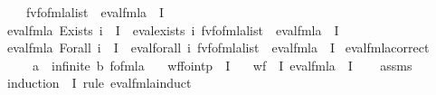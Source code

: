 \begin{isabellebody}
\ \ \ \ {\isacharparenleft}{\kern0pt}fv{\isacharunderscore}{\kern0pt}fo{\isacharunderscore}{\kern0pt}fmla{\isacharunderscore}{\kern0pt}list\ {\isasympsi}{\isacharparenright}{\kern0pt}\ {\isacharparenleft}{\kern0pt}eval{\isacharunderscore}{\kern0pt}fmla\ {\isasympsi}\ I{\isacharparenright}{\kern0pt}{\isachardoublequoteclose}\isanewline
{\isacharbar}{\kern0pt}\ {\isachardoublequoteopen}eval{\isacharunderscore}{\kern0pt}fmla\ {\isacharparenleft}{\kern0pt}Exists\ i\ {\isasymphi}{\isacharparenright}{\kern0pt}\ I\ {\isacharequal}{\kern0pt}\ eval{\isacharunderscore}{\kern0pt}exists\ i\ {\isacharparenleft}{\kern0pt}fv{\isacharunderscore}{\kern0pt}fo{\isacharunderscore}{\kern0pt}fmla{\isacharunderscore}{\kern0pt}list\ {\isasymphi}{\isacharparenright}{\kern0pt}\ {\isacharparenleft}{\kern0pt}eval{\isacharunderscore}{\kern0pt}fmla\ {\isasymphi}\ I{\isacharparenright}{\kern0pt}{\isachardoublequoteclose}\isanewline
{\isacharbar}{\kern0pt}\ {\isachardoublequoteopen}eval{\isacharunderscore}{\kern0pt}fmla\ {\isacharparenleft}{\kern0pt}Forall\ i\ {\isasymphi}{\isacharparenright}{\kern0pt}\ I\ {\isacharequal}{\kern0pt}\ eval{\isacharunderscore}{\kern0pt}forall\ i\ {\isacharparenleft}{\kern0pt}fv{\isacharunderscore}{\kern0pt}fo{\isacharunderscore}{\kern0pt}fmla{\isacharunderscore}{\kern0pt}list\ {\isasymphi}{\isacharparenright}{\kern0pt}\ {\isacharparenleft}{\kern0pt}eval{\isacharunderscore}{\kern0pt}fmla\ {\isasymphi}\ I{\isacharparenright}{\kern0pt}{\isachardoublequoteclose}\isanewline
\isanewline
{}\isamarkupfalse%
\ eval{\isacharunderscore}{\kern0pt}fmla{\isacharunderscore}{\kern0pt}correct{\isacharcolon}{\kern0pt}\isanewline
\ \ \ {\isasymphi}\ {\isacharcolon}{\kern0pt}{\isacharcolon}{\kern0pt}\ {\isachardoublequoteopen}{\isacharparenleft}{\kern0pt}{\isacharprime}{\kern0pt}a\ {\isacharcolon}{\kern0pt}{\isacharcolon}{\kern0pt}\ infinite{\isacharcomma}{\kern0pt}\ {\isacharprime}{\kern0pt}b{\isacharparenright}{\kern0pt}\ fo{\isacharunderscore}{\kern0pt}fmla{\isachardoublequoteclose}\isanewline
\ \ \ {\isachardoublequoteopen}wf{\isacharunderscore}{\kern0pt}fo{\isacharunderscore}{\kern0pt}intp\ {\isasymphi}\ I{\isachardoublequoteclose}\isanewline
\ \ \ {\isachardoublequoteopen}wf\ {\isasymphi}\ I\ {\isacharparenleft}{\kern0pt}eval{\isacharunderscore}{\kern0pt}fmla\ {\isasymphi}\ I{\isacharparenright}{\kern0pt}{\isachardoublequoteclose}\isanewline
%
\isadelimproof
\ \ %
\endisadelimproof
%
\isatagproof
{}\isamarkupfalse%
\ assms\isanewline
{}\isamarkupfalse%
\ {\isacharparenleft}{\kern0pt}induction\ {\isasymphi}\ I\ rule{\isacharcolon}{\kern0pt}\ eval{\isacharunderscore}{\kern0pt}fmla{\isachardot}{\kern0pt}induct{\isacharparenright}{\kern0pt}\isanewline

\end{isabellebody}

